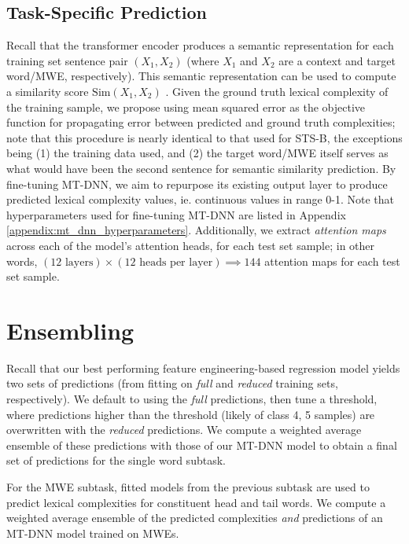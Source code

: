\documentclass{dcthesis}
\theoremstyle{definition}
\theoremstyle{remark}
\begin{document}
\subsection{Task-Specific Prediction}

Recall that the transformer encoder produces a semantic representation for each training set sentence pair $(X_1, X_2)$ (where $X_1$ and $X_2$ are a context and target word/MWE, respectively). This semantic representation can be used to compute a similarity score $\text{Sim}(X_1, X_2)$ \citep{liu2019multi}. Given the ground truth lexical complexity of the training sample, we propose using mean squared error as the objective function for propagating error between predicted and ground truth complexities; note that this procedure is nearly identical to that used for STS-B, the exceptions being (1) the training data used, and (2) the target word/MWE itself serves as what would have been the second sentence for semantic similarity prediction. By fine-tuning MT-DNN, we aim to repurpose its existing output layer to produce predicted lexical complexity values, ie. continuous values in range 0-1. Note that hyperparameters used for fine-tuning MT-DNN are listed in Appendix \ref{appendix:mt_dnn_hyperparameters}. Additionally, we extract \textit{attention maps} across each of the model's attention heads, for each test set sample; in other words, $(12 \text{ layers}) \times (12 \text{ heads per layer}) \implies 144$ attention maps for each test set sample.

\section{Ensembling}

Recall that our best performing feature engineering-based regression model yields two sets of predictions (from fitting on \textit{full} and \textit{reduced} training sets, respectively). We default to using the \textit{full} predictions, then tune a threshold, where predictions higher than the threshold (likely of class 4, 5 samples) are overwritten with the \textit{reduced} predictions. We compute a weighted average ensemble of these predictions with those of our MT-DNN model to obtain a final set of predictions for the single word subtask. 

For the MWE subtask, fitted models from the previous subtask are used to predict lexical complexities for constituent head and tail words. We compute a weighted average ensemble of the predicted complexities \textit{and} predictions of an MT-DNN model trained on MWEs.
\end{document}
